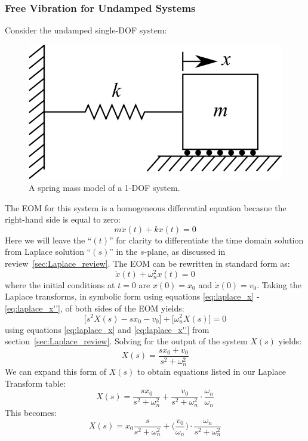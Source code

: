 \documentclass[12pt,letter]{article}
\begin{document}
			\subsubsection{Free Vibration for Undamped Systems}
			Consider the undamped single-DOF system:
			\begin{figure}[H]
				\centering
				\includegraphics[]{../figures/1-DOF-spring_mass_horizontal.png}
				\caption{A spring mass model of a 1-DOF system.}
			\end{figure}
			\noindent The EOM for this system is a homogeneous differential equation becasue the right-hand side is equal to zero:
			\begin{equation}
				m\ddot{x}(t) + kx(t) = 0 
			\end{equation}
			Here we will leave the ``$(t)$'' for clarity to differentiate the time domain solution from Laplace solution ``$(s)$'' in the $s$-plane, as discussed in review~\ref{sec:Laplace_review}. The EOM can be rewritten in standard form as:
			\begin{equation}
				\ddot{x}(t) + \omega_n^2x(t) = 0 
			\end{equation}
			where the initial conditions at $t=0$ are $x(0)=x_0$ and $\dot{x}(0) = v_0$. Taking the Laplace transforms, in symbolic form using equations \ref{eq:laplace_x} - \ref{eq:laplace_x''}, of both sides of the EOM yields:
			\begin{equation}
				\big[s^2X(s) -sx_0 -v_0 \big] + \big[ \omega_n^2X(s) \big] =0
			\end{equation}
			using equations \ref{eq:laplace_x} and \ref{eq:laplace_x''} from section~\ref{sec:Laplace_review}. Solving for the output of the system $X(s)$ yields:
			\begin{equation}
			X(s) = \frac{sx_0 + v_0}{s^2 + \omega_n^2}
			\end{equation}
			We can expand this form of $X(s)$ to obtain equations listed in our Laplace Transform table:
			\begin{equation}
			X(s) = \frac{sx_0}{s^2 + \omega_n^2} + \frac{v_0}{s^2 + \omega_n^2}\cdot \frac{\omega_n}{\omega_n}
			\end{equation}
			This becomes:
			\begin{equation}
			X(s) = x_0\frac{s}{s^2 + \omega_n^2} + \bigg(\frac{v_0}{\omega_n}\bigg) \cdot \frac{\omega_n}{s^2 + \omega_n^2}
			\end{equation}
			
\end{document}
